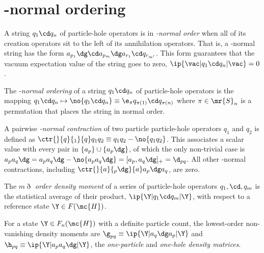 \documentclass[11pt,fleqn]{article}
\numberwithin{equation}{section}
\begin{document}
\section{\vac-normal ordering}

\begin{dfn}
A string $q_1\cd q_n$ of particle-hole operators is in \textit{\vac-normal order} when all of its creation operators sit to the left of its annihilation operators.
That is, a \vac-normal string has the form $a_{p_1}\dg\cd a_{p_m}\dg a_{r_1}\cd q_{r_{m'}}$.
This form guarantees that the vacuum expectation value of the string goes to zero, $\ip{\vac|q_1\cd q_n|\vac}=0$.
\end{dfn}

\begin{dfn}
The \textit{\vac-normal ordering} of a string $q_1\cd q_n$ of particle-hole operators is the mapping $q_1\cd q_n\mapsto\no{q_1\cd q_n}\equiv\e_{\pi}q_{\pi(1)}\cd q_{\pi(n)}$ where $\pi\in\mr{S}_n$ is a permutation that places the string in normal order.
\end{dfn}

\begin{dfn}\label{vac-normal-contraction}
A pairwise \textit{\vac-normal contraction} of two particle particle-hole operators $q_1$ and $q_2$ is defined as $\ctr{}{q}{_1}{q}q_1q_2\equiv q_1q_2 - \no{q_1q_2}$.
This associates a scalar value with every pair in $\{a_p\}\cup\{a_p\dg\}$, of which the only non-trivial case is $a_pa_q\dg=a_pa_q\dg - \no{a_pa_q\dg}=[a_p,a_q\dg]_+=\d_{pq}$.
All other \vac-normal contractions, including $\ctr{}{a}{_p\dg}{a}a_p\dg a_q$, are zero.
\end{dfn}

\begin{dfn}
The \textit{$m\eth$ order density moment} of a series of particle-hole operators $q_1,\cd,q_m$ is the statistical average of their product, $\ip{\Y|q_1\cd q_m|\Y}$, with respect to a reference state $\Y\in F(\mc{H})$.
\end{dfn}

\begin{dfn}
For a state $\Y\in F_n(\mc{H})$ with a definite particle count, the lowest-order non-vanishing density moments are $\g_{pq}\equiv\ip{\Y|a_q\dg a_p|\Y}$ and $\h_{pq}\equiv\ip{\Y|a_pa_q\dg|\Y}$, the \textit{one-particle} and \textit{one-hole density matrices}.
\end{dfn}
\end{document}
